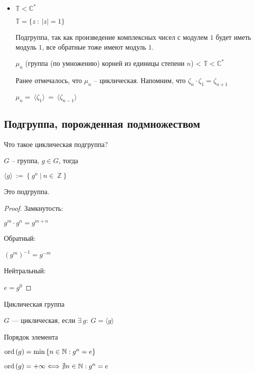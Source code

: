 \begin{itemize}
\item $\mathbb{T} < \mathbb{C}^*$

$\mathbb{T} = \{ z\ :\ |z| = 1 \}$

Подгруппа, так как произведение комплексных чисел с модулем $1$ будет иметь модуль $1$, все обратные тоже имеют модуль $1$.

$\mu_n$ (группа (по умножению) корней из единицы степени $n$) < $\mathbb{T} < \mathbb{C}^*$ 

Ранее отмечалось, что $\mu_n$ -- циклическая. Напомним, что $\zeta_n \cdot \zeta_1 = \zeta_{n+1}$

$\mu_n =\ \langle \zeta_1 \rangle\ =\ \langle\zeta_{n-1}\rangle$
\end{itemize} 

\subsection{Подгруппа, порожденная подмножеством}
Что такое циклическая подгруппа?

$G$ -- группа, $g\in G$, тогда

$\langle g \rangle\ :=\ \{\ g^n\ |\ n\in\ \mathbb{Z}\ \}$

\begin{theorem-non}
Это подгруппа.

\begin{proof}
Замкнутость: 

$g^m\cdot g^n = g^{m+n}$

Обратный: 

$(g^m)^{-1} = g^{-m}$

Нейтральный: 

$e = g^0$

\end{proof}
\end{theorem-non}

\begin{conj} Циклическая группа

$G$ --- циклическая, если $\exists\ g:\ G = \langle g \rangle$
\end{conj}

\begin{conj} Порядок элемента

  $\operatorname{ord}\left( g \right) = \min{ \{ n\in \mathbb{N} : g^n = e \} }$

  $\operatorname{ord}\left( g \right) = +\infty \Longleftrightarrow \nexists n\in \mathbb{N} : g^n = e$
\end{conj}

